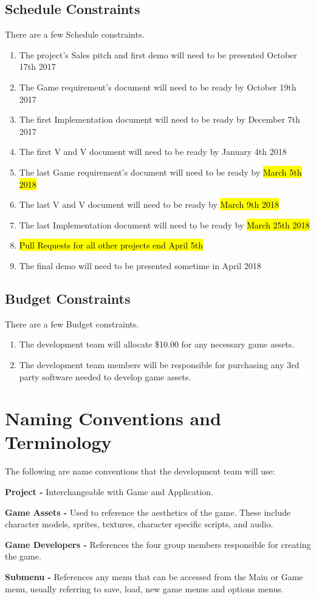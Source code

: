 \documentclass{article}
\begin{document}
\subsection{Schedule Constraints}
\quad There are a few Schedule constraints.
\begin{enumerate}[{SC}1. ]
	\item The project's  Sales pitch and first demo will need to be presented October 17th 2017
	\item The Game requirement's document will need to be ready by October 19th 2017
	\item The first Implementation document will need to be ready by December 7th 2017
	\item The first V and V document will need to be ready by January 4th 2018
	\item The last Game requirement's document will need to be ready by \hl{March 5th 2018}
	\item The last V and V document will need to be ready by \hl{March 9th 2018}
	\item The last Implementation document will need to be ready by \hl{March 25th 2018}
	\item \hl{Pull Requests for all other projects end April 5th}
	\item The final demo will need to be presented sometime in April 2018
\end{enumerate}
\subsection{Budget Constraints}
\quad There are a few Budget constraints.
\begin{enumerate}[{BC}1. ]
	\item The development team will allocate \$10.00 for any necessary game assets.
	\item The development team members will be responsible for purchasing any 3rd party software needed to develop game assets.
\end{enumerate}
\section{Naming Conventions and Terminology}
\quad The following are name conventions that the development team will use: \par
\textbf{Project - }Interchangeable with Game and Application. \par
\textbf{Game Assets - }Used to reference the aesthetics of the game. These include character models, sprites, textures, character specific scripts, and audio. \par
\textbf{Game Developers - }References the four group members responsible for creating the game. \par
\textbf{Submenu - }References any menu that can be accessed from the Main or Game menu, usually referring to save, load, new game menus and options menus. \par
\end{document}
